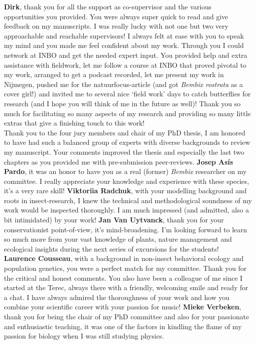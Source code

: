 \documentclass[10pt, twoside]{book} %
\begin{document}
\begin{small}
\textbf{Dirk}, thank you for all the support as co-supervisor and the various opportunities you provided. You were always super quick to read and give feedback on my manuscripts. I was really lucky with not one but two very approachable and reachable supervisors! I always felt at ease with you to speak my mind and you made me feel confident about my work. Through you I could network at INBO and get the needed expert input. You provided help and extra assistance with fieldwork, let me follow a course at INBO that proved pivotal to my work, arranged to get a podcast recorded, let me present my work in Nijmegen, pushed me for the natuurfocus-article (and got \textit{Bembix rostrata} as a cover girl!) and invited me to several nice `field work' days to catch butterflies for research (and I hope you will think of me in the future as well)! Thank you so much for facilitating so many aspects of my research and providing so many little extras that give a finishing touch to this work!\\

Thank you to the four jury members and chair of my PhD thesis, I am honored to have had such a balanced group of experts with diverse backgrounds to review my manuscript. Your comments improved the thesis and especially the last two chapters as you provided me with pre-submission peer-reviews. \textbf{Josep As\'{i}s Pardo}, it was an honor to have you as a real (former) \textit{Bembix} researcher on my committee. I really appreciate your knowledge and experience with these species, it's a very rare skill! \textbf{Viktoriia Radchuk}, with your modelling background and roots in insect-research, I knew the technical and methodological soundness of my work would be inspected thoroughly. I am much impressed (and admitted, also a bit intimidated) by your work! \textbf{Jan Van Uytvanck}, thank you for your conservationist point-of-view, it's mind-broadening. I'm looking forward to learn so much more from your vast knowledge of plants, nature management and ecological insights during the next series of excursions for the students! \textbf{Laurence Cousseau}, with a background in non-insect behavioral ecology and population genetics, you were a perfect match for my committee. Thank you for the critical and honest comments. You also have been a colleague of me since I started at the Terec, always there with a friendly, welcoming smile and ready for a chat. I have always admired the thoroughness of your work and how you combine your scientific career with your passion for music! \textbf{Mieke Verbeken}, thank you for being the chair of my PhD committee and also for your passionate and enthusiastic teaching, it was one of the factors in kindling the flame of my passion for biology when I was still studying physics.\\


\end{small}
\end{document}
